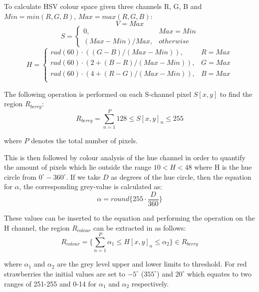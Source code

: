 \documentclass[fleqn,twoside,12pt]{report}
\begin{document}
To calculate HSV colour space given three channels R, G, B and $Min = min(R, G, B)$, $Max = max(R, G, B)$:
\begin{equation}
	V = Max
\end{equation}
\begin{equation}
	S = 
	\begin{cases} 
		0, & Max=Min \\   
		(Max-Min)/Max, & otherwise        
	\end{cases}
\end{equation}
\begin{equation}
H = 
\begin{cases} 
rad(60) \cdot ((G-B)/(Max-Min)), & R=Max \\
rad(60) \cdot (2 + (B-R)/(Max-Min)), & G=Max \\
rad(60) \cdot (4 + (R-G)/(Max-Min)), & B=Max \\   
\end{cases}
\end{equation}



The following operation is performed on each S-channel pixel $S[x,y]$ to find the region $R_{berry}$:
\begin{equation}
R_{berry} = \sum_{n=1}^{P} 128 \leq S[x,y]_n \leq 255
\end{equation}

where $P$ denotes the total number of pixels. 



This is then followed by colour analysis of the hue channel in order to quantify the amount of pixels which lie outside the range $10<H<48$ where H is the hue circle from $0^{\circ}-360^{\circ}$. If we take $D$ as degrees of the hue circle, then the equation for $\alpha$, the corresponding grey-value is calculated as:
\begin{equation}
\alpha = round\Big\{255\cdot \frac{D}{360}\Big\}
\end{equation}


These values can be inserted to the equation and performing the operation on the H channel, the region $R_{colour}$ can be extracted in as follows:
\begin{equation}
R_{colour} = \bigg\{\sum_{n=1}^{P} \alpha_1 \leq H[x,y]_n \leq \alpha_2\bigg\} \in R_{berry}
\end{equation}


where $\alpha_1$ and $\alpha_2$ are the grey level upper and lower limits to threshold. For red strawberries the initial values are set to $-5^{\circ}$ ($355^{\circ}$) and $20^{\circ}$ which equates to two ranges of 251-255 and 0-14 for $\alpha_1$ and $\alpha_2$ respectively. 
\end{document}

